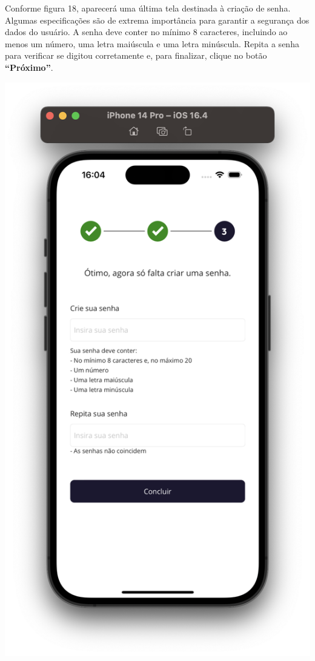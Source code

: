 Conforme figura 18, aparecerá uma última tela destinada à criação de senha. Algumas especificações são de extrema importância para garantir a segurança dos dados do usuário. A senha deve conter no mínimo 8 caracteres, incluindo ao menos um número, uma letra maiúscula e uma letra minúscula. Repita a senha para verificar se digitou corretamente e, para finalizar, clique no botão \textbf{“Próximo”}. 

    \begin{center}
        \begin{minipage}{0.3\textwidth}
            \centering
            \includegraphics[scale=0.2]{figs/figura18.png}
            \label{fig:figura18}
        \end{minipage}%
    \end{center}

